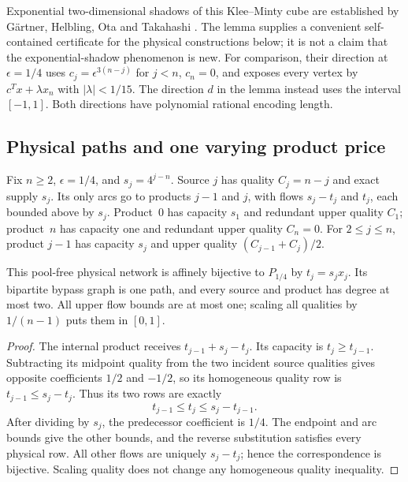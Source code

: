 Exponential two-dimensional shadows of this Klee--Minty cube are established
by G\"artner, Helbling, Ota and Takahashi
\cite[Section~4]{s6:gartner2013}. The lemma supplies a convenient
self-contained certificate for the physical constructions below; it is
not a claim that the exponential-shadow phenomenon is new.
For comparison, their direction at $\epsilon=1/4$ uses
$c_j=\epsilon^{3(n-j)}$ for $j<n$, $c_n=0$, and exposes every vertex
by $c^Tx+\lambda x_n$ with $|\lambda|<1/15$.
The direction $d$ in the lemma instead uses the interval $[-1,1]$.
Both directions have polynomial rational encoding length.

\subsection{Physical paths and one varying product price}\label{s6:physical-paths}
Fix $n\ge2$, $\epsilon=1/4$, and $s_j=4^{j-n}$. Source $j$ has
quality $C_j=n-j$ and exact supply $s_j$. Its only arcs go to products
$j-1$ and $j$, with flows $s_j-t_j$ and $t_j$, each bounded above by
$s_j$. Product~0 has capacity $s_1$ and redundant upper quality $C_1$;
product~$n$ has capacity one and redundant upper quality $C_n=0$.
For $2\le j\le n$, product $j-1$ has capacity $s_j$ and upper quality
$(C_{j-1}+C_j)/2$.

\begin{proposition}\label{s6:path-realization}
This pool-free physical network is affinely bijective to $P_{1/4}$ by
$t_j=s_jx_j$. Its bipartite bypass graph is one path, and every source
and product has degree at most two. All upper flow bounds are at most
one; scaling all qualities by $1/(n-1)$ puts them in $[0,1]$.
\end{proposition}
\begin{proof}
The internal product receives $t_{j-1}+s_j-t_j$. Its capacity is
$t_j\ge t_{j-1}$. Subtracting its midpoint quality from the two
incident source qualities gives opposite coefficients $1/2$ and
$-1/2$, so its homogeneous quality row is
$t_{j-1}\le s_j-t_j$. Thus its two rows are exactly
\begin{equation}
 t_{j-1}\le t_j\le s_j-t_{j-1}.\label{s6:physical-strip}
\end{equation}
After dividing by $s_j$, the predecessor coefficient is $1/4$.
The endpoint and arc bounds give the other bounds, and the reverse
substitution satisfies every physical row. All other flows are uniquely
$s_j-t_j$; hence the correspondence is bijective. Scaling quality does
not change any homogeneous quality inequality.
\end{proof}

